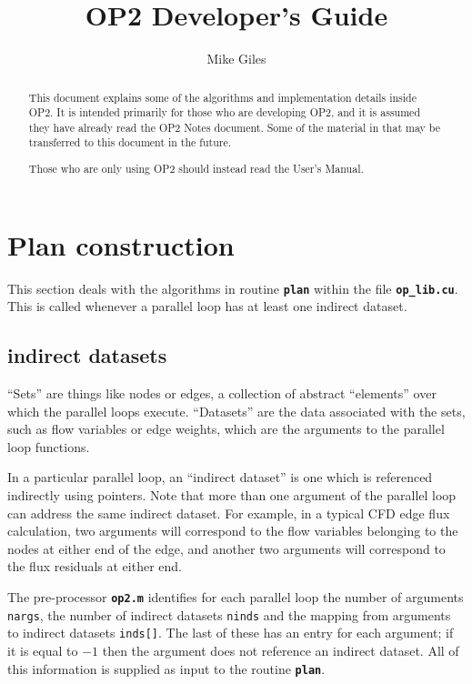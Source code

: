 \documentclass[12pt]{article}
\begin{document}
\title{OP2 Developer's Guide}
\author{Mike Giles}


\maketitle

\begin{abstract}
This document explains some of the algorithms and implementation
details inside OP2.  It is intended primarily for those who are
developing OP2, and it is assumed they have already read the OP2 
Notes document.  Some of the material in that may be transferred
to this document in the future.

Those who are only using OP2 should instead read the User's Manual.  
\end{abstract}

\section{Plan construction}

This section deals with the algorithms in routine {\tt \bf plan} 
within the file {\tt \bf op\_lib.cu}.  This is called whenever a
parallel loop has at least one indirect dataset.

\subsection{indirect datasets}

``Sets'' are things like nodes or edges, a collection of abstract 
``elements'' over which the parallel loops execute.
``Datasets'' are the data associated with the sets, such as flow 
variables or edge weights, which are the arguments to the parallel 
loop functions.

In a particular parallel loop, an ``indirect dataset'' is one which 
is referenced indirectly using pointers.  Note that more than one 
argument of the parallel loop can address the same indirect dataset.
For example, in a typical CFD edge flux calculation, two arguments
will correspond to the flow variables belonging to the nodes at either
end of the edge, and another two arguments will correspond to the
flux residuals at either end.

The pre-processor {\tt \bf op2.m} identifies for each parallel loop
the number of arguments {\tt nargs}, the number of indirect datasets
{\tt ninds} and the mapping from arguments to indirect datasets 
{\tt inds[]}.   The last of these has an entry for each argument; 
if it is equal to $-1$ then the argument does not reference an 
indirect dataset.
All of this information is supplied as input to the routine 
{\tt \bf plan}.
\end{document}
